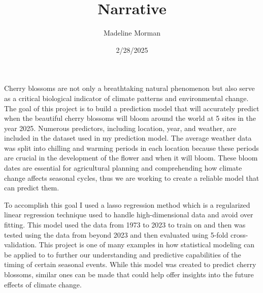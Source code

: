 \documentclass[
]{article}
\title{Narrative}
\author{Madeline Morman}
\date{2/28/2025}
\begin{document}
\maketitle

Cherry blossoms are not only a breathtaking natural phenomenon but also
serve as a critical biological indicator of climate patterns and
environmental change. The goal of this project is to build a prediction
model that will accurately predict when the beautiful cherry blossoms
will bloom around the world at 5 sites in the year 2025. Numerous
predictors, including location, year, and weather, are included in the
dataset used in my prediction model. The average weather data was split
into chilling and warming periods in each location because these periods
are crucial in the development of the flower and when it will bloom.
These bloom dates are essential for agricultural planning and
comprehending how climate change affects seasonal cycles, thus we are
working to create a reliable model that can predict them.

To accomplish this goal I used a lasso regression method which is a
regularized linear regression technique used to handle high-dimensional
data and avoid over fitting. This model used the data from 1973 to 2023
to train on and then was tested using the data from beyond 2023 and then
evaluated using 5-fold cross-validation. This project is one of many
examples in how statistical modeling can be applied to to further our
understanding and predictive capabilities of the timing of certain
seasonal events. While this model was created to predict cherry
blossoms, similar ones can be made that could help offer insights into
the future effects of climate change.
\end{document}
